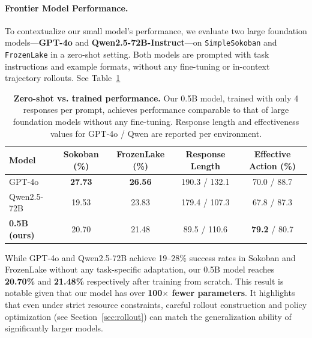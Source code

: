 \paragraph{Frontier Model Performance.} To contextualize our small model’s performance, we evaluate two large foundation models—\textbf{GPT-4o} and \textbf{Qwen2.5-72B-Instruct}—on \texttt{SimpleSokoban} and \texttt{FrozenLake} in a zero-shot setting. Both models are prompted with task instructions and example formats, without any fine-tuning or in-context trajectory rollouts. See Table~\ref{tab:foundation-models}

\begin{table}[t]
\centering
\small
\begin{tabular}{lcccc}
\toprule
\textbf{Model} & \textbf{Sokoban (\%)} & \textbf{FrozenLake (\%)} & \textbf{Response Length} & \textbf{Effective Action (\%)} \\
\midrule
GPT-4o               & \textbf{27.73} & \textbf{26.56} & 190.3 / 132.1 & 70.0 / 88.7 \\
Qwen2.5-72B          & 19.53 & 23.83 & 179.4 / 107.3 & 67.8 / 87.3 \\
\midrule
\textbf{0.5B (ours)} & 20.70 & 21.48 & 89.5 / 110.6 & \textbf{79.2} / 80.7 \\
\bottomrule
\end{tabular}
\vspace{2pt}
\caption{\textbf{Zero-shot vs. trained performance.} Our 0.5B model, trained with only 4 responses per prompt, achieves performance comparable to that of large foundation models without any fine-tuning. Response length and effectiveness values for GPT-4o / Qwen are reported per environment.}
\label{tab:foundation-models}
\end{table}

While GPT-4o and Qwen2.5-72B achieve 19–28\% success rates in Sokoban and FrozenLake without any task-specific adaptation, our 0.5B model reaches \textbf{20.70\%} and \textbf{21.48\%} respectively after training from scratch. This result is notable given that our model has over \textbf{100$\times$ fewer parameters}. It highlights that even under strict resource constraints, careful rollout construction and policy optimization (see Section~\ref{sec:rollout}) can match the generalization ability of significantly larger models.


